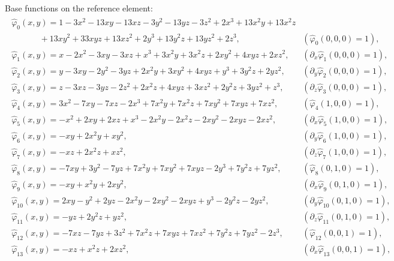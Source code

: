 \documentclass[a4paper,11pt,english]{sphinxmanual}
\begin{document}
Base functions on the reference element:
\begin{equation*}
\begin{split}\begin{array}{ll}
\widehat{\varphi}_{0}(x,y) = 1 - 3x^2 - 13xy - 13xz - 3y^2 - 13yz - 3z^2 + 2x^3 + 13x^2y + 13x^2z & \\
~~~~~~~~~~~~~~~ + 13xy^2 + 33xyz + 13xz^2 + 2y^3 + 13y^2z + 13yz^2 + 2z^3, & (\widehat{\varphi}_0(0,0,0) = 1),\\
\widehat{\varphi}_{1}(x,y) = x - 2x^2 - 3xy - 3xz + x^3 + 3x^2y + 3x^2z + 2xy^2 + 4xyz + 2xz^2, & (\partial_x\widehat{\varphi}_1(0,0,0) = 1),\\
\widehat{\varphi}_{2}(x,y) = y - 3xy - 2y^2 - 3yz + 2x^2y + 3xy^2 + 4xyz + y^3 + 3y^2z + 2yz^2, & (\partial_y\widehat{\varphi}_2(0,0,0) = 1),\\
\widehat{\varphi}_{3}(x,y) = z - 3xz - 3yz - 2z^2 + 2x^2z + 4xyz + 3xz^2 + 2y^2z + 3yz^2 + z^3, & (\partial_z\widehat{\varphi}_3(0,0,0) = 1),\\
\widehat{\varphi}_{4}(x,y) = 3x^2 - 7xy - 7xz - 2x^3 + 7x^2y + 7x^2z + 7xy^2 + 7xyz + 7xz^2, & (\widehat{\varphi}_4(1,0,0) = 1),\\
\widehat{\varphi}_{5}(x,y) = -x^2 + 2xy + 2xz + x^3 - 2x^2y - 2x^2z - 2xy^2 - 2xyz - 2xz^2, & (\partial_x\widehat{\varphi}_5(1,0,0) = 1),\\
\widehat{\varphi}_{6}(x,y) = -xy + 2x^2y + xy^2, & (\partial_y\widehat{\varphi}_6(1,0,0) = 1),\\
\widehat{\varphi}_{7}(x,y) = -xz + 2x^2z + xz^2, & (\partial_z\widehat{\varphi}_7(1,0,0) = 1),\\
\widehat{\varphi}_{8}(x,y) = -7xy + 3y^2 - 7yz + 7x^2y + 7xy^2 + 7xyz - 2y^3 + 7y^2z + 7yz^2, & (\widehat{\varphi}_8(0,1,0) = 1),\\
\widehat{\varphi}_{9}(x,y) = -xy + x^2y + 2xy^2, & (\partial_x\widehat{\varphi}_9(0,1,0) = 1),\\
\widehat{\varphi}_{10}(x,y) = 2xy - y^2 + 2yz - 2x^2y - 2xy^2 - 2xyz + y^3 - 2y^2z - 2yz^2, & (\partial_y\widehat{\varphi}_{10}(0,1,0) = 1),\\
\widehat{\varphi}_{11}(x,y) = -yz + 2y^2z + yz^2, & (\partial_z\widehat{\varphi}_{11}(0,1,0) = 1),\\
\widehat{\varphi}_{12}(x,y) = -7xz - 7yz + 3z^2 + 7x^2z + 7xyz + 7xz^2 + 7y^2z + 7yz^2 - 2z^3, & (\widehat{\varphi}_{12}(0,0,1) = 1),\\
\widehat{\varphi}_{13}(x,y) = -xz + x^2z + 2xz^2, & (\partial_x\widehat{\varphi}_{13}(0,0,1) = 1),\\

\end{array}
\end{split}
\end{equation*}
\end{document}

